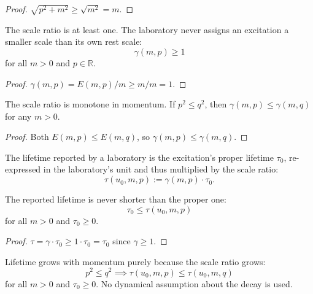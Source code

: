 \begin{proof}
$\sqrt{p^2 + m^2} \geq \sqrt{m^2} = m$.
\end{proof}

\begin{theorem}
The scale ratio is at least one. The laboratory never assigns an excitation a smaller scale than its own rest scale:
\begin{equation}
\gamma(m, p) \geq 1
\end{equation}
for all $m > 0$ and $p \in \mathbb{R}$.
\end{theorem}

\begin{proof}
$\gamma(m, p) = E(m, p)/m \geq m/m = 1$.
\end{proof}

\begin{theorem}
The scale ratio is monotone in momentum. If $p^2 \leq q^2$, then $\gamma(m, p) \leq \gamma(m, q)$ for any $m > 0$.
\end{theorem}

\begin{proof}
Both $E(m, p) \leq E(m, q)$, so $\gamma(m, p) \leq \gamma(m, q)$.
\end{proof}

\begin{definition}
The lifetime reported by a laboratory is the excitation's proper lifetime $\tau_0$, re-expressed in the laboratory's unit and thus multiplied by the scale ratio:
\begin{equation}
\tau(u_0, m, p) := \gamma(m, p) \cdot \tau_0 .
\end{equation}
\end{definition}

\begin{theorem}
The reported lifetime is never shorter than the proper one:
\begin{equation}
\tau_0 \leq \tau(u_0, m, p)
\end{equation}
for all $m > 0$ and $\tau_0 \geq 0$.
\end{theorem}

\begin{proof}
$\tau = \gamma \cdot \tau_0 \geq 1 \cdot \tau_0 = \tau_0$ since $\gamma \geq 1$.
\end{proof}

\begin{theorem}
Lifetime grows with momentum purely because the scale ratio grows:
\begin{equation}
p^2 \leq q^2 \implies \tau(u_0, m, p) \leq \tau(u_0, m, q)
\end{equation}
for all $m > 0$ and $\tau_0 \geq 0$. No dynamical assumption about the decay is used.
\end{theorem}

